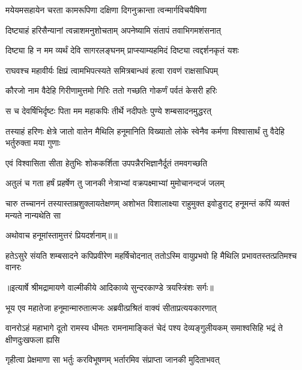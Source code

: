 \twolineshloka
{मयेयमसहायेन चरता कामरूपिणा}
{दक्षिणा दिगनुक्रान्ता त्वन्मार्गविचयैषिणा} %

\twolineshloka
{दिष्ट्याहं हरिसैन्यानां त्वन्नाशमनुशोचताम्}
{अपनेष्यामि संतापं तवाभिगमशंसनात्} %

\twolineshloka
{दिष्ट्या हि न मम व्यर्थं देवि सागरलङ्घनम्}
{प्राप्स्याम्यहमिदं दिष्ट्या त्वद्दर्शनकृतं यशः} %

\twolineshloka
{राघवश्च महावीर्यः क्षिप्रं त्वामभिपत्स्यते}
{समित्रबान्धवं हत्वा रावणं राक्षसाधिपम्} %

\twolineshloka
{कौरजो नाम वैदेहि गिरीणामुत्तमो गिरिः}
{ततो गच्छति गोकर्णं पर्वतं केसरी हरिः} %

\twolineshloka
{स च देवर्षिभिर्दृष्टः पिता मम महाकपिः}
{तीर्थे नदीपतेः पुण्ये शम्बसादनमुद्धरत्} %

\threelineshloka
{तस्याहं हरिणः क्षेत्रे जातो वातेन मैथिलि}
{हनूमानिति विख्यातो लोके स्वेनैव कर्मणा}
{विश्वासार्थं तु वैदेहि भर्तुरुक्ता मया गुणाः} %

\twolineshloka
{एवं विश्वासिता सीता हेतुभिः शोककर्शिता}
{उपपन्नैरभिज्ञानैर्दूतं तमवगच्छति} %

\twolineshloka
{अतुलं च गता हर्षं प्रहर्षेण तु जानकी}
{नेत्राभ्यां वक्रपक्ष्माभ्यां मुमोचानन्दजं जलम्} %

\threelineshloka
{चारु तच्चाननं तस्यास्ताम्रशुक्लायतेक्षणम्}
{अशोभत विशालाक्ष्या राहुमुक्त इवोडुराट्}
{हनूमन्तं कपिं व्यक्तं मन्यते नान्यथेति सा} %

{अथोवाच हनूमांस्तामुत्तरं प्रियदर्शनाम्॥॥} %

\addtocounter{shlokacount}{1}

\fourlineindentedshloka
{हतेऽसुरे संयति शम्बसादने}
{ कपिप्रवीरेण महर्षिचोदनात्}
{ततोऽस्मि वायुप्रभवो हि मैथिलि}
{ प्रभावतस्तत्प्रतिमश्च वानरः} %


{॥इत्यार्षे श्रीमद्रामायणे वाल्मीकीये आदिकाव्ये सुन्दरकाण्डे त्रयस्त्रिंशः सर्गः॥}


\twolineshloka
{भूय एव महातेजा हनूमान्मारुतात्मजः}
{अब्रवीत्प्रश्रितं वाक्यं सीताप्रत्ययकारणात्} %

\threelineshloka
{वानरोऽहं महाभागे दूतो रामस्य धीमतः}
{रामनामाङ्कितं चेदं पश्य देव्यङ्गुलीयकम्}
{समाश्वसिहि भद्रं ते क्षीणदुःखफला ह्यसि} %

\twolineshloka
{गृहीत्वा प्रेक्षमाणा सा भर्तुः करविभूषणम्}
{भर्तारमिव संप्राप्ता जानकी मुदिताभवत्} %

